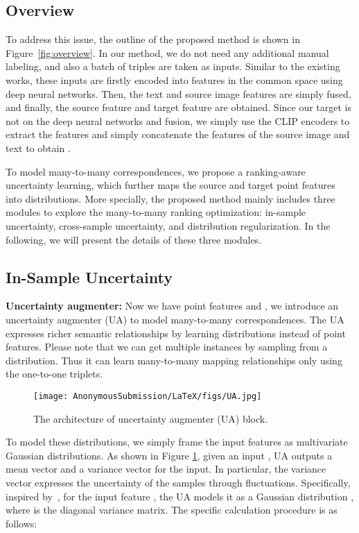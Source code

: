 \documentclass[letterpaper]{article} \usepackage{aaai24}  \usepackage{times}  \usepackage{helvet}  \usepackage{courier}  \usepackage[hyphens]{url}  \usepackage{graphicx} \urlstyle{rm} \def\UrlFont{\rm}  \usepackage{natbib}  \usepackage{caption} \frenchspacing  \setlength{\pdfpagewidth}{8.5in} \setlength{\pdfpageheight}{11in} \usepackage{amsmath,amsfonts}
\begin{document}
\subsection{Overview}

To address this issue, the outline of the proposed method is shown in Figure~\ref{fig:overview}. In our method, we do not need any additional manual labeling, and also a batch of triples are taken as inputs. Similar to the existing works, these inputs are firstly encoded into features in the common space using deep neural networks. Then, the text and source image features are simply fused, and finally, the source feature  and target feature  are obtained. Since our target is not on the deep neural networks and fusion, we simply use the CLIP encoders to extract the features and simply concatenate the features of the source image and text to obtain .  

To model many-to-many correspondences, we propose a ranking-aware uncertainty learning, which further maps the source and target point features into distributions. More specially, the proposed method mainly includes three modules to explore the many-to-many ranking optimization: in-sample uncertainty, cross-sample uncertainty, and distribution regularization. In the following, we will present the details of these three modules. 


\subsection{In-Sample Uncertainty}
\textbf{Uncertainty augmenter:} Now we have point features  and , we introduce an uncertainty augmenter (UA) to model many-to-many correspondences. 
The UA expresses richer semantic relationships by learning distributions instead of point features. Please note that we can get multiple instances by sampling from a distribution. Thus it can learn many-to-many mapping relationships only using the one-to-one triplets. 

\begin{figure}
    \centering
    \texttt{[image: AnonymousSubmission/LaTeX/figs/UA.jpg]}
    \caption{The architecture of uncertainty augmenter (UA) block.}
    \label{fig:ua}
\end{figure}

To model these distributions, we simply frame the input features as multivariate Gaussian distributions. As shown in Figure \ref{fig:ua}, given an input , UA outputs a mean vector and a variance vector for the input. In particular, the variance vector expresses the uncertainty of the samples through fluctuations. Specifically, inspired by~\cite{chun2021probabilistic, neculai2022probabilistic}, for the input feature , the UA models it as a Gaussian distribution , where  is the diagonal variance matrix. The specific calculation procedure is as follows:
\end{document}

